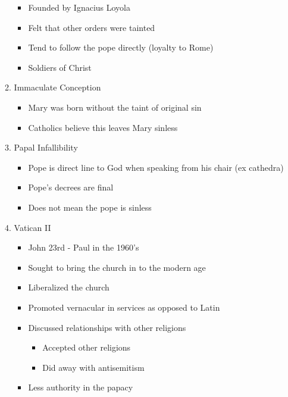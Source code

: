 \documentclass[8pt]{article}
\begin{document}
\begin{enumerate}
\begin{enumerate}
\begin{itemize}
            \item Founded by Ignacius Loyola
            \item Felt that other orders were tainted
            \item Tend to follow the pope directly (loyalty to Rome)
            \item Soldiers of Christ
        \end{itemize}
        \item Immaculate Conception
        \begin{itemize}
            \item Mary was born without the taint of original sin
            \item Catholics believe this leaves Mary sinless
        \end{itemize}
        \item Papal Infallibility
        \begin{itemize}
            \item Pope is direct line to God when speaking from his chair (ex cathedra)
            \item Pope's decrees are final
            \item Does not mean the pope is sinless
        \end{itemize}
        \item Vatican II
        \begin{itemize}
            \item John 23rd - Paul in the 1960's
            \item Sought to bring the church in to the modern age
            \item Liberalized the church
            \item Promoted vernacular in services as opposed to Latin
            \item Discussed relationships with other religions
            \begin{itemize}
                \item Accepted other religions
                \item Did away with antisemitism
            \end{itemize}
            \item Less authority in the papacy
        \end{itemize}
    \end{enumerate}


\end{enumerate}
\end{document}
